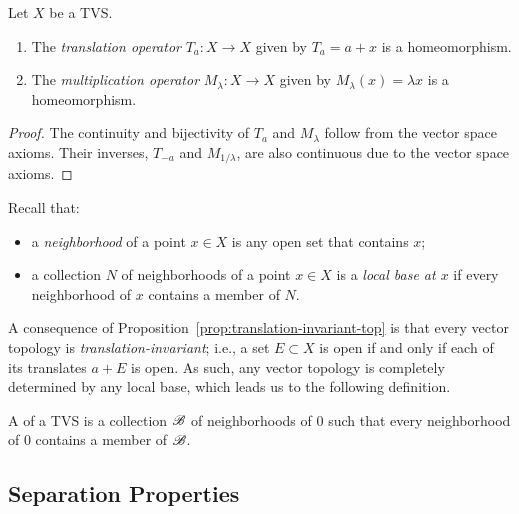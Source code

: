 \begin{proposition}\label{prop:translation-invariant-top}
	Let $X$ be a TVS.
	\mbox{}
	\begin{enumerate}[label = (\alph*),itemsep=1pt,topsep=3pt]
		\item The \textit{translation operator} $T_a:X \rightarrow X$ given by $T_a = a + x$ is a homeomorphism.
		\item The \textit{multiplication operator} $M_\lambda:X \rightarrow X$ given by $M_\lambda(x) = \lambda x$ is a homeomorphism.
	\end{enumerate}
\end{proposition}
	\begin{proof}
		The continuity and bijectivity of $T_a$ and $M_\lambda$ follow from the vector space axioms. Their inverses, $T_{-a}$ and $M_{1/\lambda}$, are also continuous due to the vector space axioms.
	\end{proof}

\begin{remark}
	Recall that:
	\mbox{}
	\begin{itemize}[itemsep=1pt,topsep=3pt]
		\item a \textit{neighborhood} of a point $x \in X$ is any open set that contains $x$;
		\item a collection $N$ of neighborhoods of a point $x \in X$ is a \textit{local base at $x$} if every neighborhood of $x$ contains a member of $N$.
	\end{itemize}
	A consequence of Proposition~\ref{prop:translation-invariant-top} is that every vector topology is \textit{translation-invariant}; i.e., a set $E \subset X$ is open if and only if each of its translates $a + E$ is open. As such, any vector topology is completely determined by any local base, which leads us to the following definition.
\end{remark}

\begin{definition}
	A  of a TVS is a collection $\mathscr{B}$ of neighborhoods of 0 such that every neighborhood of 0 contains a member of $\mathscr{B}$.
\end{definition}

\subsection{Separation Properties}

